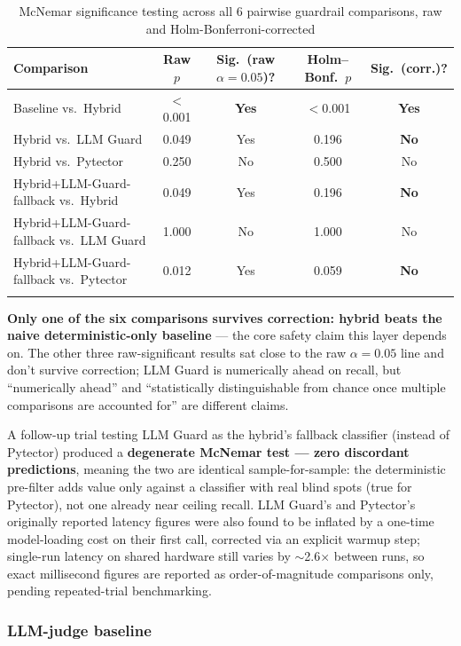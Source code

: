 \documentclass[pdflatex,sn-mathphys-num]{sn-jnl}%
\begin{document}
\begin{table}[h]
\caption{McNemar significance testing across all 6 pairwise guardrail comparisons, raw and Holm-Bonferroni-corrected}\label{tab:mcnemar6}
\begin{tabular}{@{}p{4.4cm}cccc@{}}
\toprule
Comparison & Raw $p$ & Sig.\ (raw $\alpha=0.05$)? & Holm--Bonf.\ $p$ & Sig.\ (corr.)? \\
\midrule
Baseline vs.\ Hybrid & $<$0.001 & \textbf{Yes} & $<$0.001 & \textbf{Yes} \\
Hybrid vs.\ LLM Guard & 0.049 & Yes & 0.196 & \textbf{No} \\
Hybrid vs.\ Pytector & 0.250 & No & 0.500 & No \\
Hybrid+LLM-Guard-fallback vs.\ Hybrid & 0.049 & Yes & 0.196 & \textbf{No} \\
Hybrid+LLM-Guard-fallback vs.\ LLM Guard & 1.000 & No & 1.000 & No \\
Hybrid+LLM-Guard-fallback vs.\ Pytector & 0.012 & Yes & 0.059 & \textbf{No} \\
\botrule
\end{tabular}
\end{table}

\textbf{Only one of the six comparisons survives correction: hybrid
beats the naive deterministic-only baseline} --- the core safety claim
this layer depends on. The other three raw-significant results sat
close to the raw $\alpha=0.05$ line and don't survive correction; LLM
Guard is numerically ahead on recall, but ``numerically ahead'' and
``statistically distinguishable from chance once multiple comparisons
are accounted for'' are different claims.

A follow-up trial testing LLM Guard as the hybrid's fallback classifier
(instead of Pytector) produced a \textbf{degenerate McNemar test ---
zero discordant predictions}, meaning the two are identical
sample-for-sample: the deterministic pre-filter adds value only against
a classifier with real blind spots (true for Pytector), not one already
near ceiling recall. LLM Guard's and Pytector's originally reported
latency figures were also found to be inflated by a one-time
model-loading cost on their first call, corrected via an explicit
warmup step; single-run latency on shared hardware still varies by
$\sim$2.6$\times$ between runs, so exact millisecond figures are
reported as order-of-magnitude comparisons only, pending repeated-trial
benchmarking.

\subsubsection{LLM-judge baseline}\label{subsubsec:llmjudge}
\end{document}
